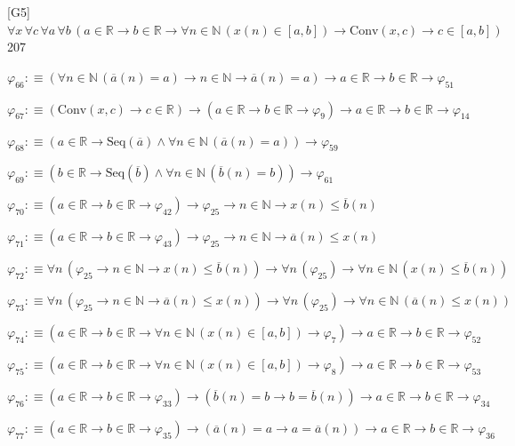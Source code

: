 \begin{fullproof}{[G5]}{$\forall x\,\forall c\,\forall a\,\forall b\,(a \in \mathbb{R} \to b \in \mathbb{R} \to \forall n \in \mathbb{N}\,(x(n) \in [a,b]) \to \mathrm{Conv}(x,c) \to c \in [a,b])$}{207}
\begin{abbrevlist}
\item $\varphi_{66} :\equiv (\forall n \in \mathbb{N}\,(\overline{a}(n) = a) \to n \in \mathbb{N} \to \overline{a}(n) = a) \to a \in \mathbb{R} \to b \in \mathbb{R} \to \varphi_{51}$
\item $\varphi_{67} :\equiv (\mathrm{Conv}(x,c) \to c \in \mathbb{R}) \to (a \in \mathbb{R} \to b \in \mathbb{R} \to \varphi_{9}) \to a \in \mathbb{R} \to b \in \mathbb{R} \to \varphi_{14}$
\item $\varphi_{68} :\equiv (a \in \mathbb{R} \to \mathrm{Seq}(\overline{a}) \land \forall n \in \mathbb{N}\,(\overline{a}(n) = a)) \to \varphi_{59}$
\item $\varphi_{69} :\equiv (b \in \mathbb{R} \to \mathrm{Seq}(\overline{b}) \land \forall n \in \mathbb{N}\,(\overline{b}(n) = b)) \to \varphi_{61}$
\item $\varphi_{70} :\equiv (a \in \mathbb{R} \to b \in \mathbb{R} \to \varphi_{42}) \to \varphi_{25} \to n \in \mathbb{N} \to x(n) \leq \overline{b}(n)$
\item $\varphi_{71} :\equiv (a \in \mathbb{R} \to b \in \mathbb{R} \to \varphi_{43}) \to \varphi_{25} \to n \in \mathbb{N} \to \overline{a}(n) \leq x(n)$
\item $\varphi_{72} :\equiv \forall n\,(\varphi_{25} \to n \in \mathbb{N} \to x(n) \leq \overline{b}(n)) \to \forall n\,(\varphi_{25}) \to \forall n \in \mathbb{N}\,(x(n) \leq \overline{b}(n))$
\item $\varphi_{73} :\equiv \forall n\,(\varphi_{25} \to n \in \mathbb{N} \to \overline{a}(n) \leq x(n)) \to \forall n\,(\varphi_{25}) \to \forall n \in \mathbb{N}\,(\overline{a}(n) \leq x(n))$
\item $\varphi_{74} :\equiv (a \in \mathbb{R} \to b \in \mathbb{R} \to \forall n \in \mathbb{N}\,(x(n) \in [a,b]) \to \varphi_{7}) \to a \in \mathbb{R} \to b \in \mathbb{R} \to \varphi_{52}$
\item $\varphi_{75} :\equiv (a \in \mathbb{R} \to b \in \mathbb{R} \to \forall n \in \mathbb{N}\,(x(n) \in [a,b]) \to \varphi_{8}) \to a \in \mathbb{R} \to b \in \mathbb{R} \to \varphi_{53}$
\item $\varphi_{76} :\equiv (a \in \mathbb{R} \to b \in \mathbb{R} \to \varphi_{33}) \to (\overline{b}(n) = b \to b = \overline{b}(n)) \to a \in \mathbb{R} \to b \in \mathbb{R} \to \varphi_{34}$
\item $\varphi_{77} :\equiv (a \in \mathbb{R} \to b \in \mathbb{R} \to \varphi_{35}) \to (\overline{a}(n) = a \to a = \overline{a}(n)) \to a \in \mathbb{R} \to b \in \mathbb{R} \to \varphi_{36}$

\end{abbrevlist}
\end{fullproof}
